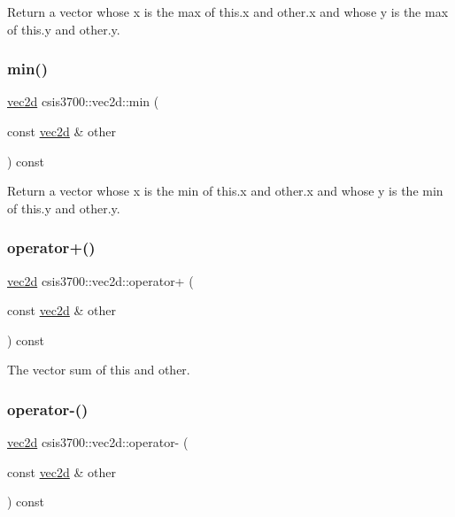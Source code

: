 Return a vector whose x is the max of this.\+x and other.\+x and whose y is the max of this.\+y and other.\+y. \mbox{\label{classcsis3700_1_1vec2d_a6368f4e6d0d7031278b540a5dda5bb91}} 
\subsubsection{\texorpdfstring{min()}{min()}}
{\footnotesize\ttfamily \hyperlink{classcsis3700_1_1vec2d}{vec2d} csis3700\+::vec2d\+::min (\begin{DoxyParamCaption}\item[{const \hyperlink{classcsis3700_1_1vec2d}{vec2d} \&}]{other }\end{DoxyParamCaption}) const}

Return a vector whose x is the min of this.\+x and other.\+x and whose y is the min of this.\+y and other.\+y. \mbox{\label{classcsis3700_1_1vec2d_af0b6fa5ce2a480ad9d0c4ab1fbbe4d1b}} 
\subsubsection{\texorpdfstring{operator+()}{operator+()}}
{\footnotesize\ttfamily \hyperlink{classcsis3700_1_1vec2d}{vec2d} csis3700\+::vec2d\+::operator+ (\begin{DoxyParamCaption}\item[{const \hyperlink{classcsis3700_1_1vec2d}{vec2d} \&}]{other }\end{DoxyParamCaption}) const}

The vector sum of this and other. \mbox{\label{classcsis3700_1_1vec2d_a423878a90a2ea8ac8174f4b8d9b2721e}} 
\subsubsection{\texorpdfstring{operator-\/()}{operator-()}}
{\footnotesize\ttfamily \hyperlink{classcsis3700_1_1vec2d}{vec2d} csis3700\+::vec2d\+::operator-\/ (\begin{DoxyParamCaption}\item[{const \hyperlink{classcsis3700_1_1vec2d}{vec2d} \&}]{other }\end{DoxyParamCaption}) const}

